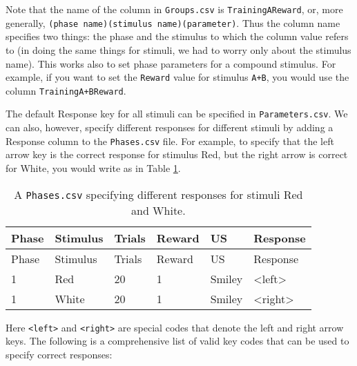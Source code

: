 \documentclass[11pt,]{article}
\begin{document}
Note that the name of the column in \texttt{Groups.csv} is
\texttt{TrainingAReward}, or, more generally,
\texttt{(phase name)(stimulus name)(parameter)}. Thus the column name
specifies two things: the phase and the stimulus to which the column
value refers to (in doing the same things for stimuli, we had to worry
only about the stimulus name). This works also to set phase parameters
for a compound stimulus. For example, if you want to set the
\texttt{Reward} value for stimulus \texttt{A+B}, you would use the
column \texttt{TrainingA+BReward}.


The default Response key for all stimuli can be specified in
\texttt{Parameters.csv}. We can also, however, specify different
responses for different stimuli by adding a Response column to the
\texttt{Phases.csv} file. For example, to specify that the left arrow
key is the correct response for stimulus Red, but the right arrow is
correct for White, you would write as in Table
\ref{per-stimulus-responses}.

\begin{longtable}[c]{@{}llllll@{}}
\caption{A \texttt{Phases.csv} specifying different responses for
stimuli Red and White. \label{per-stimulus-responses}}\tabularnewline
\toprule
Phase & Stimulus & Trials & Reward & US & Response\tabularnewline
\midrule
\endfirsthead
\toprule
Phase & Stimulus & Trials & Reward & US & Response\tabularnewline
\midrule
\endhead
1 & Red & 20 & 1 & Smiley & \textless{}left\textgreater{}\tabularnewline
1 & White & 20 & 1 & Smiley &
\textless{}right\textgreater{}\tabularnewline
\bottomrule
\end{longtable}

Here \texttt{\textless{}left\textgreater{}} and
\texttt{\textless{}right\textgreater{}} are special codes that denote
the left and right arrow keys. The following is a comprehensive list of
valid key codes that can be used to specify correct responses:
\end{document}
